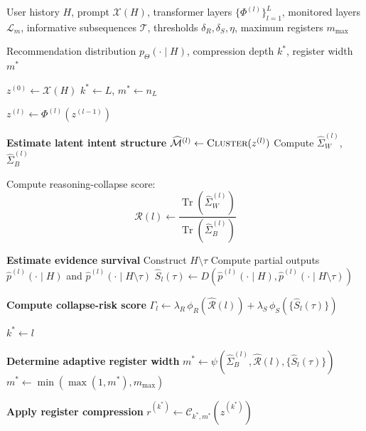 \documentclass[11pt]{article}
\begin{document}
\begin{algorithm}[t]
\caption{Collapse-Aware Register Recommendation (CARR)}
\label{alg:carr}
\begin{algorithmic}[1]

\Require User history $H$, prompt $\mathcal{X}(H)$, transformer layers $\{\Phi^{(l)}\}_{l=1}^L$, monitored layers $\mathcal{L}_m$, informative subsequences $\mathcal{T}$, thresholds $\delta_R,\delta_S,\eta$, maximum registers $m_{\max}$

\Ensure Recommendation distribution $p_{\Theta}(\cdot \mid H)$, compression depth $k^*$, register width $m^*$

\State $z^{(0)} \gets \mathcal{X}(H)$
\State $k^* \gets L$, $m^* \gets n_L$

    \State $z^{(l)} \gets \Phi^{(l)}(z^{(l-1)})$


        \State \textbf{Estimate latent intent structure}
        \State $\widehat{\mathcal{M}}^{(l)} \gets \textsc{Cluster}(z^{(l)})$
        \State Compute $\widehat{\Sigma}_W^{(l)}$, $\widehat{\Sigma}_B^{(l)}$

        \State Compute reasoning-collapse score:
        \[
        \widehat{\mathcal{R}}(l) \gets
        \frac{\operatorname{Tr}(\widehat{\Sigma}_W^{(l)})}{\operatorname{Tr}(\widehat{\Sigma}_B^{(l)})}
        \]

        \State \textbf{Estimate evidence survival}
            \State Construct $H \setminus \tau$
            \State Compute partial outputs $\hat{p}^{(l)}(\cdot \mid H)$ and $\hat{p}^{(l)}(\cdot \mid H \setminus \tau)$
            \State $\widehat{S}_l(\tau) \gets D\!\left(\hat{p}^{(l)}(\cdot \mid H), \hat{p}^{(l)}(\cdot \mid H \setminus \tau)\right)$
        \EndFor

        \State \textbf{Compute collapse-risk score}
        \State $\Gamma_l \gets \lambda_R \,\phi_R(\widehat{\mathcal{R}}(l)) + \lambda_S \,\phi_S(\{\widehat{S}_l(\tau)\})$

            \State $k^* \gets l$

            \State \textbf{Determine adaptive register width}
            \State $m^* \gets \psi(\widehat{\Sigma}_B^{(l)}, \widehat{\mathcal{R}}(l), \{\widehat{S}_l(\tau)\})$
            \State $m^* \gets \min(\max(1, m^*), m_{\max})$

            \State \textbf{Apply register compression}
            \State $r^{(k^*)} \gets \mathcal{C}_{k^*,m^*}(z^{(k^*)})$


\end{algorithmic}
\end{algorithm}
\end{document}
